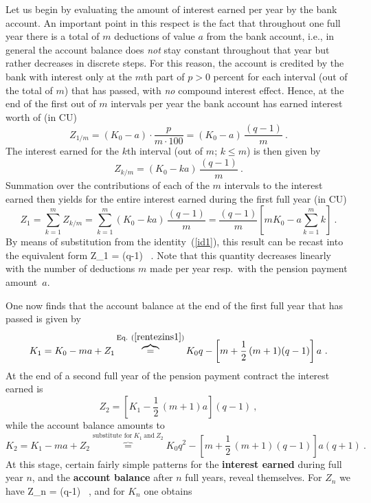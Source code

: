 \medskip
\noindent
Let us begin by evaluating the amount of interest earned per year 
by the bank account. An important point in this respect is the 
fact that throughout one full year there is a total of $m$ 
deductions of value $a$ from the bank account, i.e., in general 
the account balance does \emph{not} stay constant throughout that 
year but rather decreases in discrete steps. For this reason, the 
account is credited by the bank with interest only at the $m$th 
part of $p>0$ percent for each interval (out of the total of $m$) 
that has passed, with \emph{no} compound interest effect. Hence, 
at the end of the first out of $m$ intervals per year the bank 
account has earned interest worth of (in CU)
%
\[
Z_{1/m} = (K_{0}-a)\cdot\frac{p}{m\cdot 100}
= (K_{0}-a)\,\frac{(q-1)}{m} \ .
\]
%
The interest earned for the $k$th interval (out of $m$; $k \leq m$) is then given by
%
\[
Z_{k/m} = (K_{0}-ka)\,\frac{(q-1)}{m} \ .
\]
%
Summation over the contributions of each of the $m$ intervals to 
the interest earned then yields for the entire interest earned 
during the first full year (in CU)
%
\[
Z_{1} = \sum_{k=1}^{m}Z_{k/m}
= \sum_{k=1}^{m}(K_{0}-ka)\,\frac{(q-1)}{m}
= \frac{(q-1)}{m}\left[mK_{0}-a\sum_{k=1}^{m}k\right] \ .
\]
%
By means of substitution from the identity~(\ref{id1}), this 
result can be recast into the equivalent form
%
\be
{}
Z_{1} = (q-1) \ .
\ee
%
Note that this quantity decreases linearly with the number of 
deductions $m$ made per year resp.~with the pension payment 
amount~$a$.

\medskip
\noindent
One now finds that the account balance at the end of the first 
full year that has passed is given by
%
\[
K_{1} = K_{0} - ma + Z_{1}
\overbrace{=}^{\text{Eq.}~(\ref{rentezins1})} K_{0}q
- \left[m+\frac{1}{2}\,(m+1)(q-1)\right]a \ .
\]
%
At the end of a second full year of the pension payment contract the interest earned is
%
\[
Z_{2} = \left[K_{1}-\frac{1}{2}\,(m+1)a\right](q-1) \ ,
\]
%
while the account balance amounts to
%
\[
K_{2} = K_{1} - ma + Z_{2}
\overbrace{=}^{\text{substitute for}\ K_{1}
\ \text{and}\ Z_{2}} K_{0}q^{2}
- \left[m+\frac{1}{2}\,(m+1)(q-1)\right]a(q+1) \ .
\]
%
At this stage, certain fairly simple patterns for the {\bf 
interest earned} during full year $n$, and the {\bf account 
balance} after $n$ full years, reveal themselves. For $Z_{n}$ we 
have
%
\be
Z_{n} = (q-1) \ ,
\ee
%
and for $K_{n}$ one obtains

